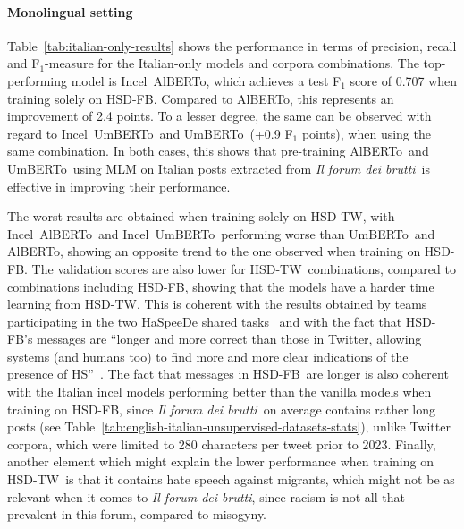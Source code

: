 \documentclass[11pt]{article}
\newcommand{\todoA}[1]{\todo[color=blue!40]{A: #1}}
\newcommand{\dsITclassification}{IFS-IT}
\newcommand{\umbert}{\mbox{UmBERTo}}
\newcommand{\albert}{\mbox{AlBERTo}}
\newcommand{\iumbert}{\mbox{Incel UmBERTo}}
\newcommand{\ialbert}{\mbox{Incel AlBERTo}}
\newcommand{\hsdfb}{\mbox{HSD-FB}}
\newcommand{\hsdtw}{\mbox{HSD-TW}}
\newcommand{\itforum}{\textit{Il forum dei brutti}}
\begin{document}
\paragraph{Monolingual setting}
Table~\ref{tab:italian-only-results} shows the performance in terms of precision, recall and F$_1$-measure for the Italian-only models and corpora combinations.
The top-performing model is \ialbert, which achieves a test F$_1$ score of 0.707 when training solely on \hsdfb. Compared to \albert, this represents an improvement of 2.4 points. To a lesser degree, the same can be observed with regard to \iumbert\, and \umbert\, (+0.9 F$_1$ points), when using the same combination. In both cases, this shows that pre-training \albert\, and \umbert\, using MLM on Italian posts extracted from \itforum\, is effective in improving their performance.

The worst results are obtained when training solely on \hsdtw, with \ialbert\, and \iumbert\, performing worse than \umbert\, and \albert, showing an opposite trend to the one observed when training on \hsdfb.
The validation scores are also lower for \hsdtw\, combinations, compared to combinations including \hsdfb, showing that the models have a harder time learning from \hsdtw. This is coherent with the results obtained by teams participating in the two HaSpeeDe shared tasks~\cite{boscoOverviewEVALITA2018,basileEVALITA2020Overview} and with the fact that \hsdfb's messages are ``longer and more correct than those in Twitter, allowing systems (and humans too) to find more and more clear indications of the presence of HS''~\cite{boscoOverviewEVALITA2018}.
The fact that messages in \hsdfb\, are longer is also coherent with the Italian incel models performing better than the vanilla models when training on \hsdfb, since \itforum\, on average contains rather long posts (see Table~\ref{tab:english-italian-unsupervised-datasets-stats}), unlike Twitter corpora, which were limited to 280 characters per tweet prior to 2023.
Finally, another element which might explain the lower performance when training on \hsdtw\, is that it contains hate speech against migrants, which might not be as relevant when it comes to \itforum, since racism is not all that prevalent in this forum, compared to misogyny.
\end{document}
